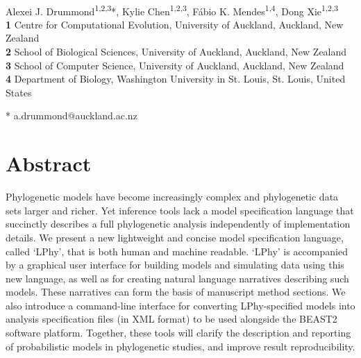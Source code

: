 \documentclass[10pt,letterpaper,table]{article}
\theoremstyle{definition}
\begin{document}
\vspace*{0.2in}

\begin{flushleft}
{\Large
\textbf{} 
}
\newline
\\
Alexei J. Drummond\textsuperscript{1,2,3}*,
Kylie Chen\textsuperscript{1,2,3},
F\'{a}bio K. Mendes\textsuperscript{1,4},
Dong Xie\textsuperscript{1,2,3}
\\
\bigskip
\textbf{1} Centre for Computational Evolution, University of Auckland, Auckland, New Zealand
\\
\textbf{2} School of Biological Sciences, University of Auckland, Auckland, New Zealand
\\
\textbf{3} School of Computer Science, University of Auckland, Auckland, New Zealand
\\
\textbf{4} Department of Biology, Washington University in St. Louis, St. Louis, United States
\\
\bigskip

% 
%

* a.drummond@auckland.ac.nz

\end{flushleft}

\section*{Abstract}
  Phylogenetic models have become increasingly complex and phylogenetic data sets larger and richer.
  Yet inference tools lack a model specification language that succinctly describes a full phylogenetic analysis independently of implementation details.
  We present a new lightweight and concise model specification language, called `LPhy', that is both human and machine readable.
  `LPhy' is accompanied by a graphical user interface for building models and simulating data using this new language, as well as for creating natural language narratives describing such models.
  These narratives can form the basis of manuscript method sections.
  We also introduce a command-line interface for converting LPhy-specified models into analysis specification files (in XML format) to be used alongside the BEAST2 software platform.
  Together, these tools will clarify the description and reporting of probabilistic models in phylogenetic studies, and improve result reproducibility.
\end{document}
